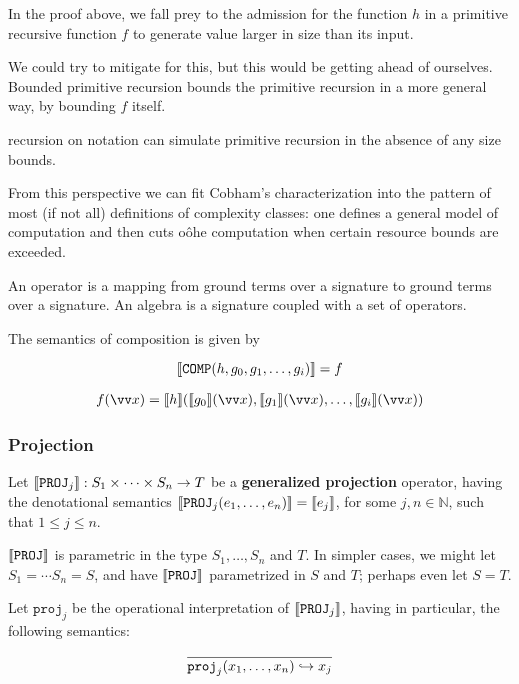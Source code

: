 In the proof above, we fall prey to the admission for the function $h$ in a
primitive recursive function $f$ to generate value larger in size than its
input.

We could try to mitigate for this, but this would be getting ahead of
ourselves. Bounded primitive recursion bounds the primitive recursion in a more
general way, by bounding $f$ itself.

recursion on notation can simulate primitive recursion in the absence of any
size bounds\cite{bellantoni-phd-1992}.

From this perspective we can fit Cobham's characterization into the pattern of
most (if not all) definitions of complexity classes: one defines a general
model of computation and then cuts oôhe computation when certain resource
bounds are exceeded.

An operator is a mapping from ground terms over a signature to ground terms
over a signature. An algebra is a signature coupled with a set of operators.

The semantics of composition is given by

$${\mathopen{}\left\llbracket{\mathtt{COMP}{\ensuremath{\mathopen{}\left({h,g_0,g_1,\ldots,g_i}\right)\mathclose{}}}}\right\rrbracket\mathclose{}} = f$$

\begin{align*}
%
f\p{\vect{x}} = \sem{h}\p{\sem{g_0}\p{\vect{x}}, \sem{g_1}\p{\vect{x}}, \ldots,
\sem{g_i}\p{\vect{x}}}
%
\end{align*}

\subsubsection{Projection}

\begin{definition} Let ${\mathopen{}\left\llbracket{\mathtt{PROJ}_j}\right\rrbracket\mathclose{}} : S_1 \times \cdots \times S_n
\rightarrow T$ be a \textbf{generalized projection} operator, having the
denotational semantics ${\mathopen{}\left\llbracket{\mathtt{PROJ}_j{\ensuremath{\mathopen{}\left({e_1,\ldots,e_n}\right)\mathclose{}}}}\right\rrbracket\mathclose{}} = {\mathopen{}\left\llbracket{e_j}\right\rrbracket\mathclose{}}$,
for some $j,n \in \mathbb{N}$, such that $1 \leq j \leq n$.  \end{definition}

\begin{remark} ${\mathopen{}\left\llbracket{\mathtt{PROJ}}\right\rrbracket\mathclose{}}$ is parametric in the type $S_1,\ldots,S_n$
and $T$. In simpler cases, we might let $S_1 = \cdots S_n = S$, and have
${\mathopen{}\left\llbracket{\mathtt{PROJ}}\right\rrbracket\mathclose{}}$ parametrized in $S$ and $T$; perhaps even let $S = T$.
\end{remark}

\begin{definition} \label{def:operational-proj}  Let
$\mathtt{proj}_j$ be the operational interpretation of ${\mathopen{}\left\llbracket{\mathtt{PROJ}_j}\right\rrbracket\mathclose{}}$,
having in particular, the following semantics:\begin{align*}
%
\axiom{ \mathtt{proj}_j\p{x_1,\ldots,x_{n}} \goesto x_j }
%
\end{align*}

\end{definition}

